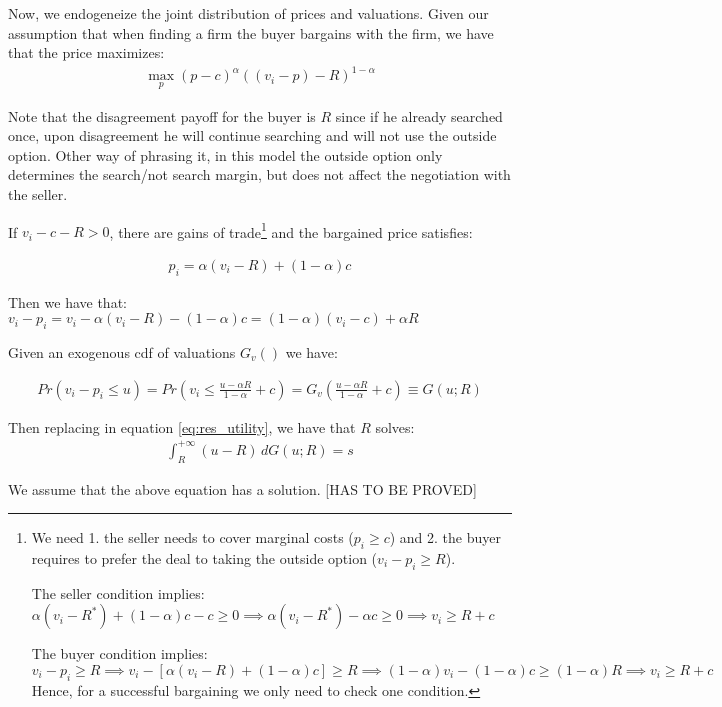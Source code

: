 \documentclass[12pt]{article}
\theoremstyle{plain}
\theoremstyle{plain}
\begin{document}
Now, we endogeneize the joint distribution of prices and valuations. Given our assumption that when finding a firm the buyer bargains with the firm, we have that the price maximizes: 
\begin{align*}
    \max_p (p-c)^\alpha ((v_i-p) - R)^{1-\alpha}
\end{align*}

Note that the disagreement payoff for the buyer is $R$ since if he already searched once, upon disagreement he will continue searching and will not use the outside option. Other way of phrasing it, in this model the outside option only determines the search/not search margin, but does not affect the negotiation with the seller. 


If $v_i - c- R> 0$, there are gains of trade\footnote{We need 1. the seller needs to cover marginal costs ($p_i\geq c$) and 2. the buyer requires to prefer the deal to taking the outside option ($v_i-p_i\geq R$). 

The seller condition implies: $\alpha (v_i - R^*)+ (1-\alpha)c - c\geq 0 \implies \alpha (v_i - R^*)-\alpha c \geq 0  \implies v_i \geq  R+  c$ 

The buyer condition implies: 
$v_i-p_i\geq R \implies v_i- [\alpha (v_i - R)+ (1-\alpha)c ]\geq R \implies (1- \alpha) v_i-  (1-\alpha)c \geq (1-\alpha) R \implies  v_i \geq  R+c$
Hence, for a successful bargaining we only need to check one condition. 
} and the bargained price satisfies: 


\begin{align}\label{eq:bargained_prices}
    p_i=\alpha (v_i - R)+ (1-\alpha)c 
\end{align}


Then we have that: 
$v_i - p_i = v_i - \alpha (v_i - R)- (1-\alpha)c  = (1-\alpha)(v_i -c) +\alpha R$

Given an exogenous cdf of valuations $G_v()$ we have: 

\begin{align}\label{eq:ut_dist}
    Pr(v_i-p_i\leq u) = Pr\left(v_i \leq \frac{u-\alpha R}{1-\alpha}+c\right)= G_v\left( \frac{u-\alpha R}{1-\alpha}+c\right) \equiv G(u; R)
\end{align}

Then replacing in equation \ref{eq:res_utility}, we have that $R$ solves: 
\begin{align}\label{eq:res_utility3}
    \int_R^{+\infty} (u - R)\, dG(u; R) = s    
\end{align}

We assume that the above equation has a solution. [HAS TO BE PROVED]
\end{document}
